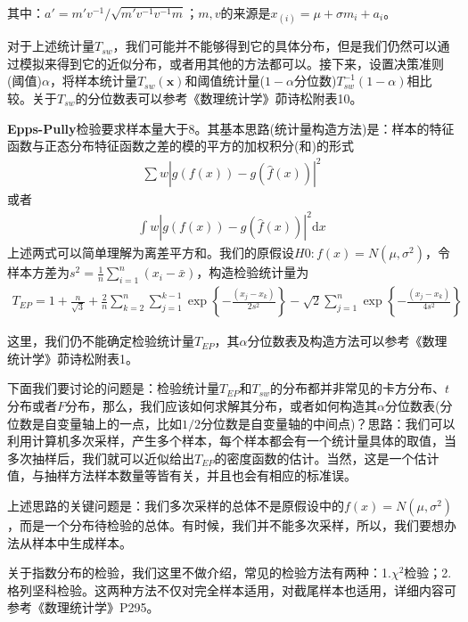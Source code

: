         其中：$a' = m'v^{-1}/\sqrt{m'v^{-1}v^{-1}m}$；$m,v$的来源是$x_{(i)} = \mu+\sigma m_i +a_i$。
        \par
        对于上述统计量$T_{sw}$，我们可能并不能够得到它的具体分布，但是我们仍然可以通过模拟来得到它的近似分布，或者用其他的方法都可以。接下来，设置决策准则(阈值)$\alpha$，将样本统计量$T_{sw}(\mathbf{x})$和阈值统计量($1-\alpha$分位数)$T_{sw}^{-1}(1-\alpha)$相比较。关于$T_{sw}$的分位数表可以参考《数理统计学》茆诗松附表10。
        \par
        \textbf{Epps-Pully}检验要求样本量大于8。其基本思路(统计量构造方法)是：样本的特征函数与正态分布特征函数之差的模的平方的加权积分(和)的形式
        \begin{align*}
        \sum w\left|g(f(x))- g(\hat{f}(x))\right|^2
        \end{align*}
        或者
        \begin{align*}
        \int w \left|g(f(x))- g(\hat{f}(x))\right|^2\mathrm{d}x
        \end{align*}
        上述两式可以简单理解为离差平方和。我们的原假设$H0:f(x) = N(\mu,\sigma^2)$，令样本方差为$s^2 = \frac{1}{n}\sum_{i = 1}^n(x_i - \bar{x})$，构造检验统计量为
        \begin{align*}
        T_{EP} = 1+\frac{n}{\sqrt{3}}+ \frac{2}{n}\sum_{k=2}^n\sum_{j=1}^{k-1}\exp\left\{-\frac{(x_j-x_k)}{2s^2}\right\} - \sqrt{2}\sum_{j=1}^n\exp\left\{ -\frac{(x_j-x_k)}{4s^2} \right\}
        \end{align*}
        \par
        这里，我们仍不能确定检验统计量$T_{EP}$，其$\alpha$分位数表及构造方法可以参考《数理统计学》茆诗松附表1。
        \par
        下面我们要讨论的问题是：检验统计量$T_{EP}$和$T_{sw}$的分布都并非常见的卡方分布、$t$分布或者$F$分布，那么，我们应该如何求解其分布，或者如何构造其$\alpha$分位数表(分位数是自变量轴上的一点，比如$1/2$分位数是自变量轴的中间点)？思路：我们可以利用计算机多次采样，产生多个样本，每个样本都会有一个统计量具体的取值，当多次抽样后，我们就可以近似给出$T_{EP}$的密度函数的估计。当然，这是一个估计值，与抽样方法样本数量等皆有关，并且也会有相应的标准误。
        \par
        上述思路的关键问题是：我们多次采样的总体不是原假设中的$f(x) = N(\mu,\sigma^2)$，而是一个分布待检验的总体。有时候，我们并不能多次采样，所以，我们要想办法从样本中生成样本。
        \par
        关于指数分布的检验，我们这里不做介绍，常见的检验方法有两种：1.$\chi^2$检验；2.格列坚科检验。这两种方法不仅对完全样本适用，对截尾样本也适用，详细内容可参考《数理统计学》P295。
